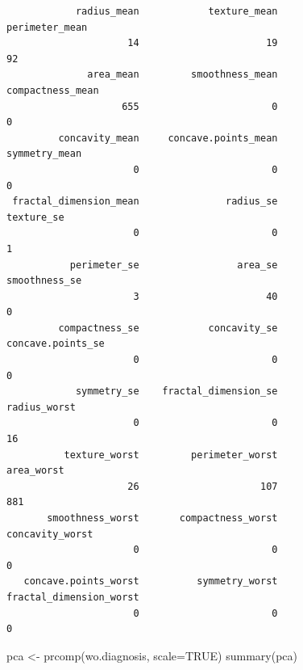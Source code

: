 \documentclass[
  letterpaper,
  DIV=11,
  numbers=noendperiod]{scrartcl}
\newenvironment{Shaded}{\begin{snugshade}}{\end{snugshade}}
\newcommand{\AttributeTok}[1]{\textcolor[rgb]{0.40,0.45,0.13}{#1}}
\newcommand{\ConstantTok}[1]{\textcolor[rgb]{0.56,0.35,0.01}{#1}}
\newcommand{\FunctionTok}[1]{\textcolor[rgb]{0.28,0.35,0.67}{#1}}
\newcommand{\NormalTok}[1]{\textcolor[rgb]{0.00,0.23,0.31}{#1}}
\newcommand{\OtherTok}[1]{\textcolor[rgb]{0.00,0.23,0.31}{#1}}
\begin{document}
\begin{verbatim}
            radius_mean            texture_mean          perimeter_mean 
                     14                      19                      92 
              area_mean         smoothness_mean        compactness_mean 
                    655                       0                       0 
         concavity_mean     concave.points_mean           symmetry_mean 
                      0                       0                       0 
 fractal_dimension_mean               radius_se              texture_se 
                      0                       0                       1 
           perimeter_se                 area_se           smoothness_se 
                      3                      40                       0 
         compactness_se            concavity_se       concave.points_se 
                      0                       0                       0 
            symmetry_se    fractal_dimension_se            radius_worst 
                      0                       0                      16 
          texture_worst         perimeter_worst              area_worst 
                     26                     107                     881 
       smoothness_worst       compactness_worst         concavity_worst 
                      0                       0                       0 
   concave.points_worst          symmetry_worst fractal_dimension_worst 
                      0                       0                       0 
\end{verbatim}

\begin{Shaded}
\begin{Highlighting}[]
\NormalTok{pca }\OtherTok{\textless{}{-}} \FunctionTok{prcomp}\NormalTok{(wo.diagnosis, }\AttributeTok{scale=}\ConstantTok{TRUE}\NormalTok{)}
\FunctionTok{summary}\NormalTok{(pca)}
\end{Highlighting}
\end{Shaded}
\end{document}
